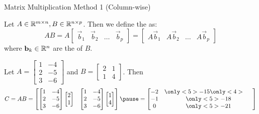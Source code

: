\documentclass[xcoler=dvipsnames, aspectratio=169]{beamer}
\begin{document}
    \begin{frame}{Matrix Multiplication Method 1 (Column-wise)}
        \small
        \begin{tcolorbox}
            Let $A\in\mathbb{R}^{m\times n},B\in\mathbb{R}^{n\times p}$. Then we define the 
            as: 
            \[
                AB = A\begin{bmatrix} \vec{b}_1 & \vec{b}_2 & \dots & \vec{b}_p\end{bmatrix} =
                    \begin{bmatrix} A\vec{b}_1 & A\vec{b}_2 & \dots & A\vec{b}_p\end{bmatrix}
            \]
            where $\mathbf{b}_k\in\mathbb{R}^n$ are the  of $B$.
        \end{tcolorbox}\pause
        \vspace{-10pt}
        \begin{example}
            Let $A = \begin{bmatrix}1&-4\\2&-5\\3&-6\end{bmatrix}$ and $B = \begin{bmatrix}
                2&1\\1&4
        \end{bmatrix}$. Then \pause
        \[
            C = AB = \begin{bmatrix}\begin{bmatrix}1&-4\\2&-5\\3&-6\end{bmatrix}\begin{bmatrix}
    2\\1\end{bmatrix}
                & \begin{bmatrix}1&-4\\2&-5\\3&-6\end{bmatrix}\begin{bmatrix}1\\4\end{bmatrix}\end{bmatrix}\pause
                    = \begin{bmatrix}
                        -2 & \only<5> {-15}\only<4>{\quad\,\,}\\
                        -1 & \only<5> {-18}\\
                         0 & \only<5> {-21}
                    \end{bmatrix}
        \]
        \end{example}
    \end{frame}
\end{document}
